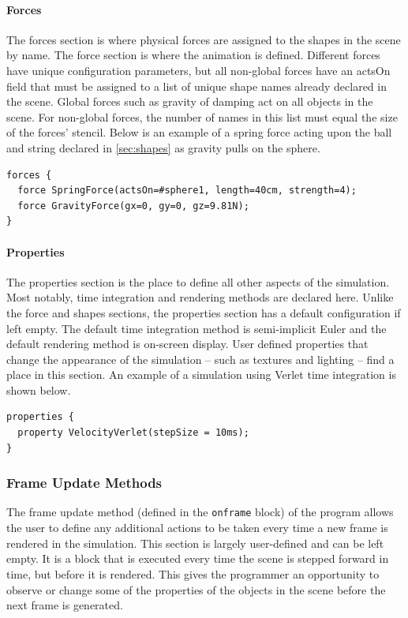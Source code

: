\paragraph{Forces}

The forces section is where physical forces are assigned to the shapes
in the scene by name. The force section is where the animation is
defined. Different forces have unique configuration parameters, but
all non-global forces have an actsOn field that must be assigned to a
list of unique shape names already declared in the scene. Global
forces such as gravity of damping act on all objects in the scene. For
non-global forces, the number of names in this list must equal the
size of the forces' stencil. Below is an example of a spring force
acting upon the ball and string declared in \ref{sec:shapes} as
gravity pulls on the sphere.

\begin{verbatim}
forces {
  force SpringForce(actsOn=#sphere1, length=40cm, strength=4);
  force GravityForce(gx=0, gy=0, gz=9.81N);
}
\end{verbatim}
 
\paragraph{Properties}

The properties section is the place to define all other aspects of the
simulation. Most notably, time integration and rendering methods are
declared here. Unlike the force and shapes sections, the properties
section has a default configuration if left empty. The default time
integration method is semi-implicit Euler and the default rendering
method is on-screen display. User defined properties that change the
appearance of the simulation -- such as textures and lighting -- find
a place in this section. An example of a simulation using Verlet time
integration is shown below.

\begin{verbatim}
properties {
  property VelocityVerlet(stepSize = 10ms);
}
\end{verbatim}
 
\subsubsection{Frame Update Methods}
The frame update method (defined in the \texttt{onframe} block) of the
program allows the user to define any additional actions to be taken
every time a new frame is rendered in the simulation. This section is
largely user-defined and can be left empty. It is a block that is
executed every time the scene is stepped forward in time, but before
it is rendered. This gives the programmer an opportunity to observe or
change some of the properties of the objects in the scene before the
next frame is generated.

